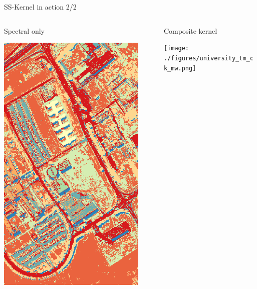 \documentclass[10pt,aspectratio=1610,,color={dvipsnames,usenames,table},table]{beamer}
\begin{document}
\begin{frame}[label={sec:orga109bbe}]{SS-Kernel in action 2/2}
\begin{columns}
\begin{column}{0.3\columnwidth}
\begin{block}{Spectral only}
\begin{center}
\includegraphics[width=0.9\textwidth]{./figures/mrf_labels.png}
\end{center}
\end{block}
\end{column}

\begin{column}{0.3\columnwidth}
\begin{block}{Composite kernel}
\begin{center}
\texttt{[image: ./figures/university\_tm\_ck\_mw.png]}
\end{center}
\end{block}
\end{column}


\end{columns}
\end{frame}
\end{document}
